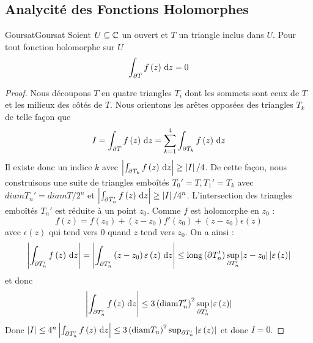 \documentclass{cours}
\begin{document}
\subsection{Analycité des Fonctions Holomorphes}
\begin{lemme}{Goursat}{Goursat}
    Soient $U \subseteq \mathbb{C}$ un ouvert et $T$ un triangle inclus dans $U$. Pour tout fonction holomorphe sur $U$
    \begin{equation*}
        \int_{\partial T}f\left(z\right){\rm \, d} z = 0
    \end{equation*}
\end{lemme}
\begin{proof}
    Nous découpons $T$ en quatre triangles $T_{i}$ dont les sommets sont ceux de $T$ et les milieux des côtés de $T$. Nous orientons les arêtes opposées des triangles $T_{k}$ de telle façon que 
    \begin{equation*}
        I = \int_{\partial T}f\left(z\right){\rm \, d} z = \sum_{k = 1}^{4}\int_{\partial T_{k}}f\left(z\right){\rm \, d} z
    \end{equation*}
    Il existe donc un indice $k$ avec $\left|\int_{\partial T_{k}}f\left(z\right){\rm \, d} z\right| \geq \left|I\right|/4$. De cette façon, nous construisons une suite de triangles emboîtés $T_{0}' = T, T_{1}' = T_{k}$ avec $diam T_{n}' = diam T/2^{n}$ et $\left|\int_{\partial T_{n}'} f\left(z\right){\rm \, d} z\right| \geq \left|I\right|/4^{n}$.
	L'intersection des triangles emboîtés $T_{n}'$ est réduite à un point $z_{0}$. Comme $f$ est holomorphe en $z_{0}$ : 
	\begin{equation*}
		f\left(z\right) = f\left(z_{0}\right) + \left(z - z_{0}\right)f'\left(z_{0}\right) + \left(z - z_{0}\right)\epsilon\left(z\right)
	\end{equation*}
	avec $\epsilon\left(z\right)$ qui tend vers $0$ quand $z$ tend vers $z_{0}$.  
	On a ainsi :
	\begin{equation*}
		\left|\int_{\partial T_{n}'} f\left(z\right){\rm \, d} z\right| = \left|\int_{\partial T_{n}'} \left(z - z_{0}\right) \varepsilon\left(z\right) {\rm \, d} z\right| \leq {\rm long}\left(\partial T_{n}'\right) \sup_{\partial T_{n}'} \left|z - z_{0}\right|\left|\varepsilon\left(z\right)\right|
	\end{equation*}
	et donc 
	\begin{equation*}
		\left|\int_{\partial T_{n}'} f\left(z\right){\rm \, d} z\right|\leq 3 \left({\rm diam}T_{n}'\right)^{2}\sup_{\partial T_{n}'}\left|\varepsilon\left(z\right)\right|
	\end{equation*}
	Donc $\left|I\right| \leq 4^{n}\left|\int_{\partial T_{n}'} f\left(z\right) {\rm \, d} z\right| \leq 3 \left({\rm diam}T_{n}\right)^{2}\sup_{\partial T_{n}'}\left|\varepsilon\left(z\right)\right|$ et donc $I = 0$.
\end{proof}
\end{document}
